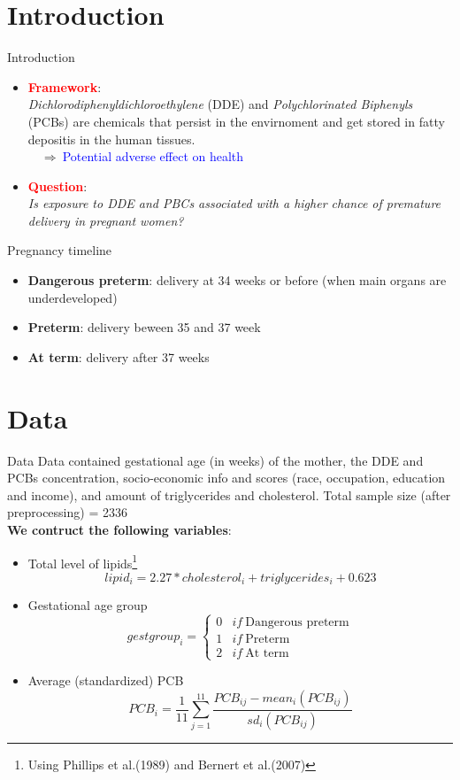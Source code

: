 \documentclass{beamer}\usepackage[]{graphicx}\usepackage[]{color}
\begin{document}
\section{Introduction}
\begin{frame}{Introduction}
\begin{itemize}
\item \textcolor{red}{\textbf{Framework}}: \\
\textit{Dichlorodiphenyldichloroethylene} (DDE) and \textit{Polychlorinated Biphenyls} (PCBs) 
are chemicals that persist in the envirnoment and get stored in fatty depositis in the human tissues.\\
$\quad \Longrightarrow \ $\textcolor{blue}{Potential adverse effect on health}
\item \textcolor{red}{\textbf{Question}}:\\
\textit{Is exposure to DDE and PBCs associated with a higher chance of premature delivery in pregnant women?}
\end{itemize}
\begin{block}{Pregnancy timeline}
\begin{itemize}
\item \textbf{Dangerous preterm}:  delivery at 34 weeks or before (when main organs are underdeveloped)
\item \textbf{Preterm}: delivery beween 35 and 37 week
\item \textbf{At term}: delivery after 37 weeks
\end{itemize}
\end{block}
\end{frame}

\section{Data}
\begin{frame}{Data}
\footnotesize
Data contained gestational age (in weeks) of the mother, the DDE and PCBs concentration, socio-economic info and scores (race, occupation, education and income), and amount of triglycerides and cholesterol. Total sample size (after preprocessing) = 2336\\
\textbf{We contruct the following variables}:
\begin{itemize}
\item Total level of lipids\footnote{Using Phillips et al.(1989) and Bernert et al.(2007)} $$lipid_i =  2.27 * cholesterol_i + triglycerides_i + 0.623$$ 
\item Gestational age group $$gestgroup_i = 
\begin{cases}
0 & if \ \textrm{Dangerous preterm} \\
1 & if \ \textrm{Preterm} \\
2 & if \ \textrm{At term} 
\end{cases}$$
\item Average (standardized) PCB $$PCB_i = \frac{1}{11}\sum_{j=1}^{11} \frac{PCB_{ij} - mean_i(PCB_{ij})}{sd_i(PCB_{ij})}$$
\end{itemize}
\end{frame}
\end{document}
